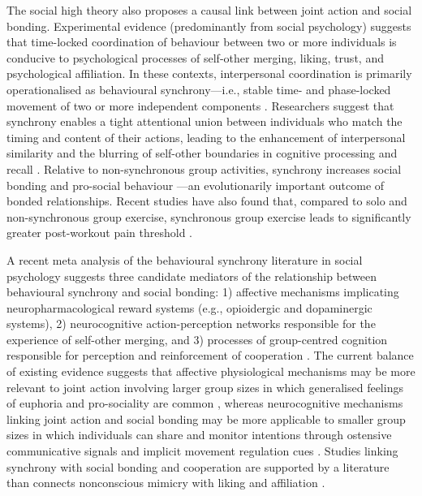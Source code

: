 \begin{CJK}{UTF8}{gbsn}
The social high theory also proposes a causal link between joint action and social bonding.  Experimental evidence (predominantly from social psychology) suggests that time-locked coordination of behaviour between two or more individuals is conducive to psychological processes of self-other merging, liking, trust, and psychological affiliation.  In these contexts, interpersonal coordination is primarily operationalised as behavioural synchrony---i.e., stable time- and phase-locked movement of two or more independent components  \citep[limbs, bodies, fingers, etc.; see][]{Pikovsky2007}. Researchers suggest that synchrony enables a tight attentional union between individuals who match the timing and content of their actions, leading to the enhancement of interpersonal similarity and the blurring of self-other boundaries in cognitive processing and recall \citep{Cohen2017}.  Relative to non-synchronous group activities, synchrony increases social bonding and pro-social behaviour \citep{Reddish2013,Reddish2013a,Wiltermuth2009,Tarr2014}---an evolutionarily important outcome of bonded relationships.  Recent studies have also found that, compared to solo and non-synchronous group exercise, synchronous group exercise leads to significantly greater post-workout pain threshold \citep{Cohen2009,Sullivan2014,Sullivan2013a, Sullivan2013b}.

A recent meta analysis of the behavioural synchrony literature in social psychology suggests three candidate mediators of the relationship between behavioural synchrony and social bonding: 1) affective mechanisms implicating neuropharmacological reward systems (e.g., opioidergic and dopaminergic systems), 2) neurocognitive action-perception networks responsible for the experience of self-other merging, and 3) processes of group-centred cognition responsible for perception and reinforcement of cooperation \citep{Mogan2017}.  The current balance of existing evidence suggests that affective physiological mechanisms may be more relevant to joint action involving larger group sizes in which generalised feelings of euphoria and pro-sociality are common \citep[e.g., mass religious rituals or music festivals; see][]{Weinstein2016}, whereas neurocognitive mechanisms linking joint action and social bonding may be more applicable to smaller group sizes in which individuals can share and monitor intentions through ostensive communicative signals and implicit movement regulation cues \citep{Lang2017}.  Studies linking synchrony with social bonding and cooperation are supported by a literature than connects nonconscious mimicry with liking and affiliation \citep{VanBaaren2009}.


\end{CJK}
